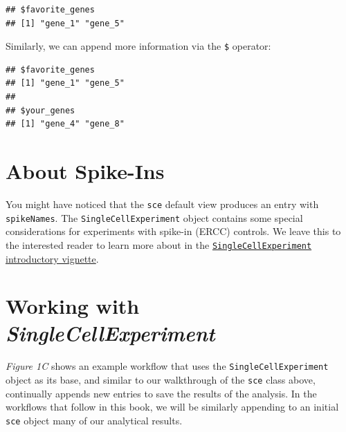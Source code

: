 \documentclass[]{book}
\newenvironment{Shaded}{\begin{snugshade}}{\end{snugshade}}
\newcommand{\KeywordTok}[1]{\textcolor[rgb]{0.13,0.29,0.53}{\textbf{#1}}}
\newcommand{\NormalTok}[1]{#1}
\newcommand{\OperatorTok}[1]{\textcolor[rgb]{0.81,0.36,0.00}{\textbf{#1}}}
\newcommand{\StringTok}[1]{\textcolor[rgb]{0.31,0.60,0.02}{#1}}
\begin{document}
\begin{verbatim}
## $favorite_genes
## [1] "gene_1" "gene_5"
\end{verbatim}

Similarly, we can append more information via the \texttt{\$} operator:

\begin{Shaded}
\end{Shaded}

\begin{verbatim}
## $favorite_genes
## [1] "gene_1" "gene_5"
## 
## $your_genes
## [1] "gene_4" "gene_8"
\end{verbatim}

\hypertarget{about-spike-ins}{%
\section{About Spike-Ins}\label{about-spike-ins}}

You might have noticed that the \texttt{sce} default view produces an entry with \texttt{spikeNames}. The \texttt{SingleCellExperiment} object contains some special considerations for experiments with spike-in (ERCC) controls. We leave this to the interested reader to learn more about in the \href{https://bioconductor.org/packages/release/bioc/vignettes/SingleCellExperiment/inst/doc/intro.html}{\texttt{SingleCellExperiment} introductory vignette}.

\hypertarget{working-with-singlecellexperiment}{%
\section{\texorpdfstring{Working with \emph{SingleCellExperiment}}{Working with SingleCellExperiment}}\label{working-with-singlecellexperiment}}

\emph{Figure 1C} shows an example workflow that uses the \texttt{SingleCellExperiment} object as its base, and similar to our walkthrough of the \texttt{sce} class above, continually appends new entries to save the results of the analysis. In the workflows that follow in this book, we will be similarly appending to an initial \texttt{sce} object many of our analytical results.
\end{document}
